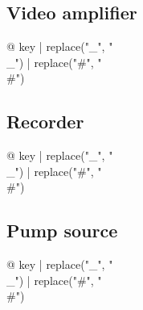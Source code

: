 \begin{multicols}{2}
\subsection{Video amplifier}

\begin{description}
\item[{@ key | replace("_", "\\_") | replace("#", "\\#") }] %
\end{description}

\subsection{Recorder}

\begin{description}
\item[{@ key | replace("_", "\\_") | replace("#", "\\#") }] %
\end{description}

\subsection{Pump source}

\begin{description}
\item[{@ key | replace("_", "\\_") | replace("#", "\\#") }] %
\end{description}


\end{multicols}
